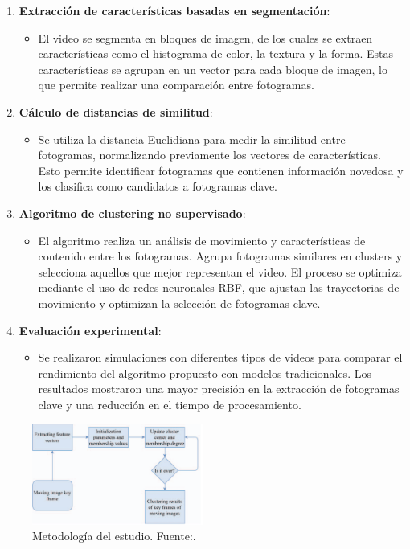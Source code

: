 \begin{enumerate}
	\item \textbf{Extracción de características basadas en segmentación}:
	\begin{itemize}
		\item El video se segmenta en bloques de imagen, de los cuales se extraen características como el histograma de color, la textura y la forma. Estas características se agrupan en un vector para cada bloque de imagen, lo que permite realizar una comparación entre fotogramas.
	\end{itemize}
	
	\item \textbf{Cálculo de distancias de similitud}:
	\begin{itemize}
		\item Se utiliza la distancia Euclidiana para medir la similitud entre fotogramas, normalizando previamente los vectores de características. Esto permite identificar fotogramas que contienen información novedosa y los clasifica como candidatos a fotogramas clave.
	\end{itemize}
	
	\item \textbf{Algoritmo de clustering no supervisado}:
	\begin{itemize}
		\item El algoritmo realiza un análisis de movimiento y características de contenido entre los fotogramas. Agrupa fotogramas similares en clusters y selecciona aquellos que mejor representan el video. El proceso se optimiza mediante el uso de redes neuronales RBF, que ajustan las trayectorias de movimiento y optimizan la selección de fotogramas clave.
	\end{itemize}
	\item \textbf{Evaluación experimental}:
	\begin{itemize}
		\item Se realizaron simulaciones con diferentes tipos de videos para comparar el rendimiento del algoritmo propuesto con modelos tradicionales. Los resultados mostraron una mayor precisión en la extracción de fotogramas clave y una reducción en el tiempo de procesamiento.
	\end{itemize}
\end{enumerate}
\begin{figure}[H]
	\centering
	\includegraphics[width=0.5\textwidth]{2/figures/Metodologia_ant_4.png}
	\caption{Metodología del estudio. Fuente:\cite {wang2023keyframe}.}
	\label{fig:etiqueta_de_la_figura}
\end{figure}

